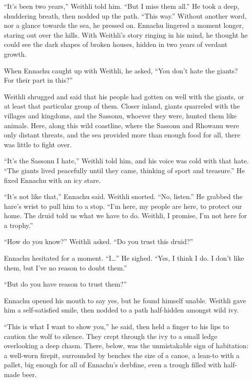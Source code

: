 ``It's been two years,'' Weithli told him. ``But I miss them all.'' He took a deep, shuddering breath, then nodded up the path. ``This way.'' Without another word, nor a glance towards the sea, he pressed on. Ennachu lingered a moment longer, staring out over the hills. With Weithli's story ringing in his mind, he thought he could see the dark shapes of broken houses, hidden in two years of verdant growth.

When Ennachu caught up with Weithli, he asked, ``You don't hate the giants? For their part in this?''

Weithli shrugged and said that his people had gotten on well with the giants, or at least that particular group of them. Closer inland, giants quarreled with the villages and kingdoms, and the Sassonu, whoever they were, hunted them like animals. Here, along this wild coastline, where the Sassonu and Rhowanu were only distant threats, and the sea provided more than enough food for all, there was little to fight over.

``It's the Sassonu I hate,'' Weithli told him, and his voice was cold with that hate. ``The giants lived peacefully until they came, thinking of sport and treasure.'' He fixed Ennachu with an icy stare.

``It's not like that,'' Ennachu said. Weithli snorted. ``No, listen.'' He grabbed the hare's wrist to pull him to a stop. ``I'm here, my people are here, to protect our home. The druid told us what we have to do. Weithli, I promise, I'm not here for a trophy.''

``How do you know?'' Weithli asked. ``Do you trust this druid?''

Ennachu hesitated for a moment. ``I\ldots'' He sighed. ``Yes, I think I do. I don't like them, but I've no reason to doubt them.''

``But do you have reason to trust them?''

Ennachu opened his mouth to say yes, but he found himself unable. Weithli gave him a self-satisfied smile, then nodded to a path half-hidden amongst wild ivy.

``This is what I want to show you,'' he said, then held a finger to his lips to caution the wolf to silence. They crept through the ivy to a small ledge overlooking a deep chasm. There, below, was the unmistakable sign of habitation: a well-worn firepit, surrounded by benches the size of a canoe, a lean-to with a pallet, big enough for all of Ennachu's derbfine, even a trough filled with half-made beer.


